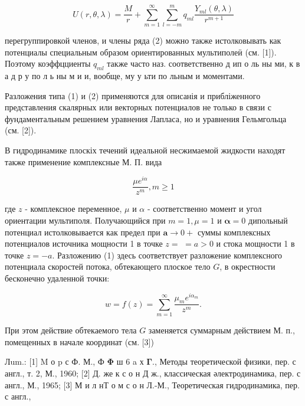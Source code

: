 \documentclass[10pt]{article}
\begin{document}
\[

U(r, \theta, \lambda)=\frac{M}{r}+\sum_{m=1}^{\infty} \sum_{l=-m}^{m} q_{m l} \frac{Y_{m l}(\theta, \lambda)}{r^{m+1}}

\]



перегруппировкой членов, и члены ряда (2) можно также истолковывать как потенциалы специальным образом ориентированных мультиполеӥ (см. [1]). Поэтому коэффцциенты $q_{m l}$ также часто наз. соответственно д ип о ль ны ми, к в а д р у по л ь ны м и и, вообще, му у ьти по льным и моментами.



Разложения типа (1) и (2) применяются для описанія и прибліженного представления скалярных или векторных потенциалов не только в связи с фундаментальным решением уравнения Лапласа, но и уравнения Гельмгольца (см. [2]).



В гидродинамике плоскіх течений идеальной несжимаемой жидкости находят также применение комплексные М. П. вида



\[

\frac{\mu e^{i \alpha}}{z^{m}}, m \geqslant 1

\]



где $z$ - комплексное переменное, $\mu$ и $\alpha$ - соответственно момент и угол ориентации мультиполя. Получающийся при $m=1, \mu=1$ и $\boldsymbol{\alpha}=0$ дипольный потенциал истолковывается как предел при $\boldsymbol{a} \rightarrow 0+$ суммы комплексных потенциалов источника мощности 1 в точке $z=$ $=a>0$ и стока мощности 1 в точке $z=-a$. Разложению (1) здесь соответствует разложение комплексного потенциала скоростей потока, обтекающего плоское тело $G$, в окрестности бесконечно удаленной точки:



\[

w=f(z)=\sum_{m=1}^{\infty} \frac{\mu_{m} e^{i \alpha_{m}}}{z^{m}} .

\]



При этом действие обтекаемого тела $G$ заменяется суммарным действием М. п., помещенных в начале координат (см. [3])



Лum.: [1] M о p с Ф. М., Ф $\mathbf{\Phi}$ ш 6 a х $\boldsymbol{\Gamma}$., Методы теоретической физики, пер. с англ., т. 2, М., 1960; [2] Д. же к с о н Д ж., классическая әлектродинамика, пер. с англ., М., 1965; [3] М и л нТ о м с о н Л.-М., Теоретическая гидродинамика, пер. с англ.,
\end{document}
